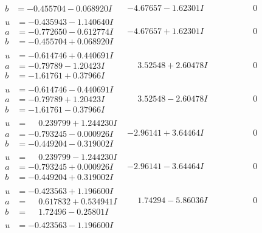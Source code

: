 \documentclass[1p]{elsarticle_modified}
\theoremstyle{definition}
\begin{document}
$$\begin{array}{c|c|c}
\begin{aligned}
b &= -0.455704 - 0.068920 I\end{aligned}
 & -4.67657 - 1.62301 I & \phantom{-0.000000 } 0 \\ \hline\begin{aligned}
u &= -0.435943 - 1.140640 I \\
a &= -0.772650 - 0.612774 I \\
b &= -0.455704 + 0.068920 I\end{aligned}
 & -4.67657 + 1.62301 I & \phantom{-0.000000 } 0 \\ \hline\begin{aligned}
u &= -0.614746 + 0.440691 I \\
a &= -0.79789 - 1.20423 I \\
b &= -1.61761 + 0.37966 I\end{aligned}
 & \phantom{-}3.52548 + 2.60478 I & \phantom{-0.000000 } 0 \\ \hline\begin{aligned}
u &= -0.614746 - 0.440691 I \\
a &= -0.79789 + 1.20423 I \\
b &= -1.61761 - 0.37966 I\end{aligned}
 & \phantom{-}3.52548 - 2.60478 I & \phantom{-0.000000 } 0 \\ \hline\begin{aligned}
u &= \phantom{-}0.239799 + 1.244230 I \\
a &= -0.793245 - 0.000926 I \\
b &= -0.449204 - 0.319002 I\end{aligned}
 & -2.96141 + 3.64464 I & \phantom{-0.000000 } 0 \\ \hline\begin{aligned}
u &= \phantom{-}0.239799 - 1.244230 I \\
a &= -0.793245 + 0.000926 I \\
b &= -0.449204 + 0.319002 I\end{aligned}
 & -2.96141 - 3.64464 I & \phantom{-0.000000 } 0 \\ \hline\begin{aligned}
u &= -0.423563 + 1.196600 I \\
a &= \phantom{-}0.617832 + 0.534941 I \\
b &= \phantom{-}1.72496 - 0.25801 I\end{aligned}
 & \phantom{-}1.74294 - 5.86036 I & \phantom{-0.000000 } 0 \\ \hline\begin{aligned}
u &= -0.423563 - 1.196600 I \\

\end{aligned}
\end{array}$$
\end{document}
